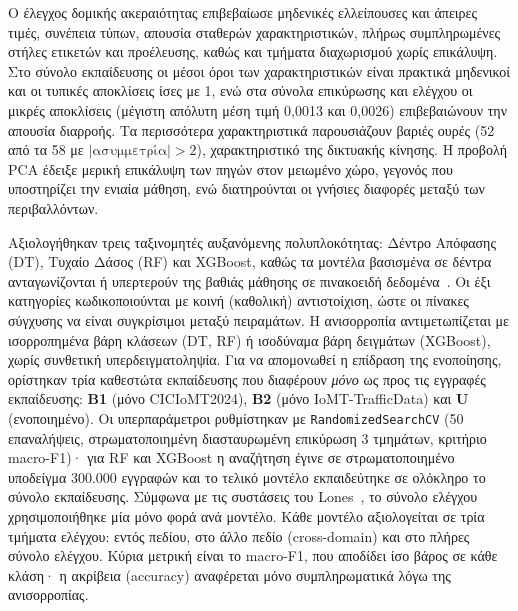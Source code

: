 
Ο έλεγχος δομικής ακεραιότητας επιβεβαίωσε μηδενικές ελλείπουσες και άπειρες τιμές, συνέπεια τύπων, απουσία σταθερών χαρακτηριστικών, πλήρως συμπληρωμένες στήλες ετικετών και προέλευσης, καθώς και τμήματα διαχωρισμού χωρίς επικάλυψη. Στο σύνολο εκπαίδευσης οι μέσοι όροι των χαρακτηριστικών είναι πρακτικά μηδενικοί και οι τυπικές αποκλίσεις ίσες με 1, ενώ στα σύνολα επικύρωσης και ελέγχου οι μικρές αποκλίσεις (μέγιστη απόλυτη μέση τιμή 0,0013 και 0,0026) επιβεβαιώνουν την απουσία διαρροής. Τα περισσότερα χαρακτηριστικά παρουσιάζουν βαριές ουρές (52 από τα 58 με $|\text{ασυμμετρία}| > 2$), χαρακτηριστικό της δικτυακής κίνησης. Η προβολή PCA έδειξε μερική επικάλυψη των πηγών στον μειωμένο χώρο, γεγονός που υποστηρίζει την ενιαία μάθηση, ενώ διατηρούνται οι γνήσιες διαφορές μεταξύ των περιβαλλόντων.


Αξιολογήθηκαν τρεις ταξινομητές αυξανόμενης πολυπλοκότητας: Δέντρο Απόφασης (DT), Τυχαίο Δάσος (RF) και XGBoost, καθώς τα μοντέλα βασισμένα σε δέντρα ανταγωνίζονται ή υπερτερούν της βαθιάς μάθησης σε πινακοειδή δεδομένα~\cite{grinsztajn2022tree}. Οι έξι κατηγορίες κωδικοποιούνται με κοινή (καθολική) αντιστοίχιση, ώστε οι πίνακες σύγχυσης να είναι συγκρίσιμοι μεταξύ πειραμάτων. Η ανισορροπία αντιμετωπίζεται με ισορροπημένα βάρη κλάσεων (DT, RF) ή ισοδύναμα βάρη δειγμάτων (XGBoost), χωρίς συνθετική υπερδειγματοληψία. Για να απομονωθεί η επίδραση της ενοποίησης, ορίστηκαν τρία καθεστώτα εκπαίδευσης που διαφέρουν \textit{μόνο} ως προς τις εγγραφές εκπαίδευσης: \textbf{B1} (μόνο CICIoMT2024), \textbf{B2} (μόνο IoMT-TrafficData) και \textbf{U} (ενοποιημένο). Οι υπερπαράμετροι ρυθμίστηκαν με \texttt{RandomizedSearchCV} (50 επαναλήψεις, στρωματοποιημένη διασταυρωμένη επικύρωση 3 τμημάτων, κριτήριο macro-F1)· για RF και XGBoost η αναζήτηση έγινε σε στρωματοποιημένο υποδείγμα 300.000 εγγραφών και το τελικό μοντέλο εκπαιδεύτηκε σε ολόκληρο το σύνολο εκπαίδευσης. Σύμφωνα με τις συστάσεις του Lones~\cite{lones2024avoid}, το σύνολο ελέγχου χρησιμοποιήθηκε μία μόνο φορά ανά μοντέλο. Κάθε μοντέλο αξιολογείται σε τρία τμήματα ελέγχου: εντός πεδίου, στο άλλο πεδίο (cross-domain) και στο πλήρες σύνολο ελέγχου. Κύρια μετρική είναι το macro-F1, που αποδίδει ίσο βάρος σε κάθε κλάση· η ακρίβεια (accuracy) αναφέρεται μόνο συμπληρωματικά λόγω της ανισορροπίας.


